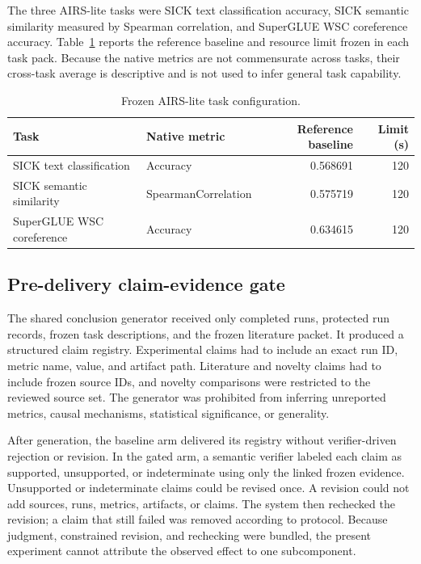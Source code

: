 \documentclass[11pt]{article}
\begin{document}
The three AIRS-lite tasks were SICK text classification accuracy, SICK semantic similarity measured by Spearman correlation, and SuperGLUE WSC coreference accuracy. Table~\ref{tab:tasks} reports the reference baseline and resource limit frozen in each task pack. Because the native metrics are not commensurate across tasks, their cross-task average is descriptive and is not used to infer general task capability.

\begin{table}[H]
\centering
\caption{Frozen AIRS-lite task configuration.}
\label{tab:tasks}
\begin{tabularx}{\textwidth}{>{\raggedright\arraybackslash}X l r r}
\toprule
Task & Native metric & Reference baseline & Limit (s) \\
\midrule
SICK text classification & Accuracy & 0.568691 & 120 \\
SICK semantic similarity & SpearmanCorrelation & 0.575719 & 120 \\
SuperGLUE WSC coreference & Accuracy & 0.634615 & 120 \\
\bottomrule
\end{tabularx}
\end{table}

\subsection{Pre-delivery claim-evidence gate}

The shared conclusion generator received only completed runs, protected run records, frozen task descriptions, and the frozen literature packet. It produced a structured claim registry. Experimental claims had to include an exact run ID, metric name, value, and artifact path. Literature and novelty claims had to include frozen source IDs, and novelty comparisons were restricted to the reviewed source set. The generator was prohibited from inferring unreported metrics, causal mechanisms, statistical significance, or generality.

After generation, the baseline arm delivered its registry without verifier-driven rejection or revision. In the gated arm, a semantic verifier labeled each claim as supported, unsupported, or indeterminate using only the linked frozen evidence. Unsupported or indeterminate claims could be revised once. A revision could not add sources, runs, metrics, artifacts, or claims. The system then rechecked the revision; a claim that still failed was removed according to protocol. Because judgment, constrained revision, and rechecking were bundled, the present experiment cannot attribute the observed effect to one subcomponent.
\end{document}
